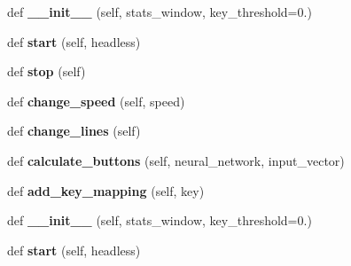 \begin{DoxyCompactItemize}
\item 
def {\bfseries \+\_\+\+\_\+init\+\_\+\+\_\+} (self, stats\+\_\+window, key\+\_\+threshold=0.)\hypertarget{classGameController_1_1GameController_a8e0ebfe57e0c1850047d4f271e296187}{}\label{classGameController_1_1GameController_a8e0ebfe57e0c1850047d4f271e296187}

\item 
def {\bfseries start} (self, headless)\hypertarget{classGameController_1_1GameController_a000e1b43edbc5454673763a491f53d27}{}\label{classGameController_1_1GameController_a000e1b43edbc5454673763a491f53d27}

\item 
def {\bfseries stop} (self)\hypertarget{classGameController_1_1GameController_adceb4b825410df4ac33c63732c5ebb1c}{}\label{classGameController_1_1GameController_adceb4b825410df4ac33c63732c5ebb1c}

\item 
def {\bfseries change\+\_\+speed} (self, speed)\hypertarget{classGameController_1_1GameController_a6e9c793d9f9c7f91ef86fdfbad1f399c}{}\label{classGameController_1_1GameController_a6e9c793d9f9c7f91ef86fdfbad1f399c}

\item 
def {\bfseries change\+\_\+lines} (self)\hypertarget{classGameController_1_1GameController_a6df31616562721415f855506ac39200e}{}\label{classGameController_1_1GameController_a6df31616562721415f855506ac39200e}

\item 
def {\bfseries calculate\+\_\+buttons} (self, neural\+\_\+network, input\+\_\+vector)\hypertarget{classGameController_1_1GameController_adfa21a1d6a41248487a720c5311eb5c7}{}\label{classGameController_1_1GameController_adfa21a1d6a41248487a720c5311eb5c7}

\item 
def {\bfseries add\+\_\+key\+\_\+mapping} (self, key)\hypertarget{classGameController_1_1GameController_a7828e77aa375bd536fe94f502cf177e5}{}\label{classGameController_1_1GameController_a7828e77aa375bd536fe94f502cf177e5}

\item 
def {\bfseries \+\_\+\+\_\+init\+\_\+\+\_\+} (self, stats\+\_\+window, key\+\_\+threshold=0.)\hypertarget{classGameController_1_1GameController_a8e0ebfe57e0c1850047d4f271e296187}{}\label{classGameController_1_1GameController_a8e0ebfe57e0c1850047d4f271e296187}

\item 
def {\bfseries start} (self, headless)\hypertarget{classGameController_1_1GameController_a000e1b43edbc5454673763a491f53d27}{}\label{classGameController_1_1GameController_a000e1b43edbc5454673763a491f53d27}


\end{DoxyCompactItemize}
